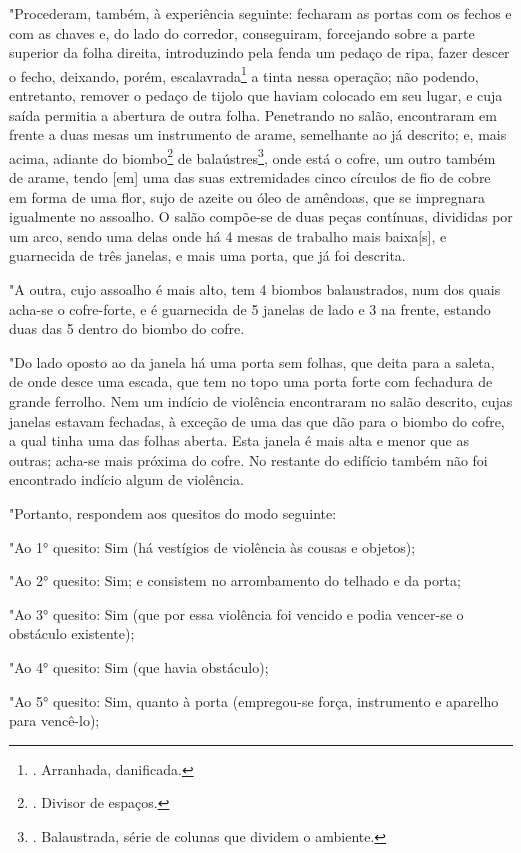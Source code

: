 "Procederam, também, à experiência seguinte: fecharam as portas com os
fechos e com as chaves e, do lado do corredor, conseguiram, forcejando
sobre a parte superior da folha direita, introduzindo pela fenda um
pedaço de ripa, fazer descer o fecho, deixando, porém,
escalavrada\footnote{. Arranhada, danificada.} a tinta nessa operação;
não podendo, entretanto, remover o pedaço de tijolo que haviam colocado
em seu lugar, e cuja saída permitia a abertura de outra folha.
Penetrando no salão, encontraram em frente a duas mesas um instrumento
de arame, semelhante ao já descrito; e, mais acima, adiante do
biombo\footnote{. Divisor de espaços.} de balaústres\footnote{.
  Balaustrada, série de colunas que dividem o ambiente.}, onde está o
cofre, um outro também de arame, tendo {[}em{]} uma das suas
extremidades cinco círculos de fio de cobre em forma de uma flor, sujo
de azeite ou óleo de amêndoas, que se impregnara igualmente no assoalho.
O salão compõe-se de duas peças contínuas, divididas por um arco, sendo
uma delas onde há 4 mesas de trabalho mais baixa{[}s{]}, e guarnecida de
três janelas, e mais uma porta, que já foi descrita.

"A outra, cujo assoalho é mais alto, tem 4 biombos balaustrados, num dos
quais acha-se o cofre-forte, e é guarnecida de 5 janelas de lado e 3 na
frente, estando duas das 5 dentro do biombo do cofre.

"Do lado oposto ao da janela há uma porta sem folhas, que deita para a
saleta, de onde desce uma escada, que tem no topo uma porta forte com
fechadura de grande ferrolho. Nem um indício de violência encontraram no
salão descrito, cujas janelas estavam fechadas, à exceção de uma das que
dão para o biombo do cofre, a qual tinha uma das folhas aberta. Esta
janela é mais alta e menor que as outras; acha-se mais próxima do cofre.
No restante do edifício também não foi encontrado indício algum de
violência.

"Portanto, respondem aos quesitos do modo seguinte:

"Ao 1° quesito: Sim (há vestígios de violência às cousas e objetos);

"Ao 2° quesito: Sim; e consistem no arrombamento do telhado e da porta;

"Ao 3° quesito: Sim (que por essa violência foi vencido e podia
vencer-se o obstáculo existente);

"Ao 4° quesito: Sim (que havia obstáculo);

"Ao 5° quesito: Sim, quanto à porta (empregou-se força, instrumento e
aparelho para vencê-lo);

